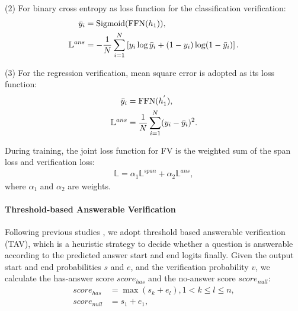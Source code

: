 \documentclass[letterpaper]{article} %
\begin{document}
(2) For binary cross entropy as loss function for the classification verification:
\begin{equation}
\begin{split}
\bar{y}_{i} &= \textup{Sigmoid}(\textup{FFN}(h_1)),\\
\mathbb{L}^{ans} &= -\frac{1}{N}\sum_{i=1}^{N}\left [ y_{i}\log\bar{y}_{i} + (1-y _{i})\log(1-\bar{y}_{i})\right ].
\end{split}
\end{equation}

(3) For the regression verification, %
mean square error is adopted as its loss function:
\begin{align}
\bar{y}_{i} &= \textup{FFN}(h^{'}_{1}),\\
\mathbb{L}^{ans}&= \frac{1}{N}\sum_{i=1}^{N}(y_{i}-\bar{y}_{i})^{2}.
\end{align}


During training, the joint loss function for FV is the weighted sum of the span loss and verification loss:
\begin{align}
\mathbb{L} = \alpha_{1}\mathbb{L}^{span} + \alpha_{2} \mathbb{L}^{ans},
\end{align}
where $\alpha_{1}$ and $\alpha_{2}$ are weights.

\paragraph{Threshold-based Answerable Verification}\label{sec:ap}
Following previous studies \cite{devlin2018bert,yang2019xlnet,liu2019roberta,Lan2020ALBERT}, we adopt threshold based answerable verification (TAV), which is a heuristic strategy to decide whether a question is answerable according to the predicted answer start and end logits finally. Given the output start and end probabilities $s$ and $e$, and the verification probability $v$, we calculate the has-answer score $score_{has}$ and the no-answer score $score_{null}$:
\begin{equation}
\begin{split}
score_{has} & =\max (s_k + e_l),1 < k \le l \le n, \\
score_{null} & = s_1+e_1,
\end{split}
\end{equation}
\end{document}
